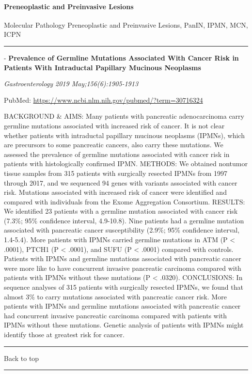 \documentclass[]{article}
\let\oldparagraph\paragraph
\renewcommand{\paragraph}[1]{\oldparagraph{#1}\mbox{}}
\begin{document}
\pagebreak

\hypertarget{preneoplastic-and-preinvasive-lesions}{%
\paragraph{Preneoplastic and Preinvasive
Lesions}\label{preneoplastic-and-preinvasive-lesions}}

Molecular Pathology Preneoplastic and Preinvasive Lesions, PanIN, IPMN,
MCN, ICPN

\begin{center}\rule{0.5\linewidth}{\linethickness}\end{center}

 - \textbf{Prevalence of Germline Mutations Associated With Cancer Risk
in Patients With Intraductal Papillary Mucinous Neoplasms}

\emph{Gastroenterology 2019 May;156(6):1905-1913}

PubMed: \url{https://www.ncbi.nlm.nih.gov/pubmed/?term=30716324}

BACKGROUND \& AIMS: Many patients with pancreatic adenocarcinoma carry
germline mutations associated with increased risk of cancer. It is not
clear whether patients with intraductal papillary mucinous neoplasms
(IPMNs), which are precursors to some pancreatic cancers, also carry
these mutations. We assessed the prevalence of germline mutations
associated with cancer risk in patients with histologically confirmed
IPMN. METHODS: We obtained nontumor tissue samples from 315 patients
with surgically resected IPMNs from 1997 through 2017, and we sequenced
94 genes with variants associated with cancer risk. Mutations associated
with increased risk of cancer were identified and compared with
individuals from the Exome Aggregation Consortium. RESULTS: We
identified 23 patients with a germline mutation associated with cancer
risk (7.3\%; 95\% confidence interval, 4.9-10.8). Nine patients had a
germline mutation associated with pancreatic cancer susceptibility
(2.9\%; 95\% confidence interval, 1.4-5.4). More patients with IPMNs
carried germline mutations in ATM (P \textless{} .0001), PTCH1 (P
\textless{} .0001), and SUFU (P \textless{} .0001) compared with
controls. Patients with IPMNs and germline mutations associated with
pancreatic cancer were more like to have concurrent invasive pancreatic
carcinoma compared with patients with IPMNs without these mutations (P
\textless{} .0320). CONCLUSIONS: In sequence analyses of 315 patients
with surgically resected IPMNs, we found that almost 3\% to carry
mutations associated with pancreatic cancer risk. More patients with
IPMNs and germline mutations associated with pancreatic cancer had
concurrent invasive pancreatic carcinoma compared with patients with
IPMNs without these mutations. Genetic analysis of patients with IPMNs
might identify those at greatest risk for cancer.

{}

{}

\begin{center}\rule{0.5\linewidth}{\linethickness}\end{center}

Back to top

\begin{center}\rule{0.5\linewidth}{\linethickness}\end{center}

\pagebreak
\end{document}
